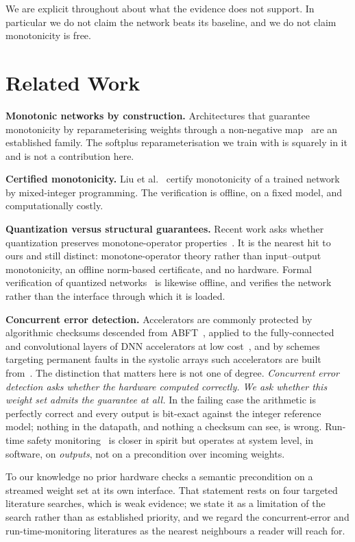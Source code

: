 \documentclass[conference]{IEEEtran}
\begin{document}
We are explicit throughout about what the evidence does not support. In
particular we do not claim the network beats its baseline, and we do not claim
monotonicity is free.

\section{Related Work}

\textbf{Monotonic networks by construction.} Architectures that guarantee
monotonicity by reparameterising weights through a non-negative
map~\cite{runje2023,scalable2024} are an established family. The softplus
reparameterisation we train with is squarely in it and is not a contribution
here.

\textbf{Certified monotonicity.} Liu et al.~\cite{liu2020} certify monotonicity
of a trained network by mixed-integer programming. The verification is offline,
on a fixed model, and computationally costly.

\textbf{Quantization versus structural guarantees.} Recent work asks whether
quantization preserves monotone-operator properties~\cite{quantmon2026}. It is
the nearest hit to ours and still distinct: monotone-operator theory rather
than input--output monotonicity, an offline norm-based certificate, and no
hardware. Formal verification of quantized networks~\cite{qvip2022} is likewise
offline, and verifies the network rather than the interface through which it is
loaded.

\textbf{Concurrent error detection.} Accelerators are commonly protected by
algorithmic checksums descended from ABFT~\cite{huang1984}, applied to the
fully-connected and convolutional layers of DNN accelerators at low
cost~\cite{ozen2020}, and by schemes targeting permanent faults in the systolic
arrays such accelerators are built from~\cite{zhang2018}. The distinction
that matters here is not one of degree. \emph{Concurrent error detection asks
whether the hardware computed correctly. We ask whether this weight set admits
the guarantee at all.} In the failing case the arithmetic is perfectly correct
and every output is bit-exact against the integer reference model; nothing in
the datapath, and nothing a checksum can see, is wrong. Run-time safety
monitoring~\cite{xiang2022} is closer in spirit but operates at system level,
in software, on \emph{outputs}, not on a precondition over incoming weights.

To our knowledge no prior hardware checks a semantic precondition on a streamed
weight set at its own interface. That statement rests on four targeted
literature searches, which is weak evidence; we state it as a limitation of the
search rather than as established priority, and we regard the concurrent-error
and run-time-monitoring literatures as the nearest neighbours a reader will
reach for.
\end{document}
